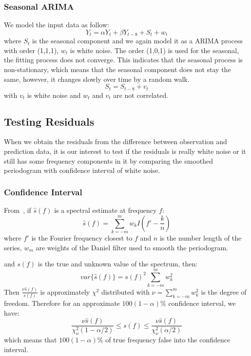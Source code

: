 \documentclass[12pt]{article}
\begin{document}
\subsubsection{Seasonal ARIMA}
We model the input data as follow:
\begin{equation}
Y_t = \alpha Y_t+\beta Y_{t-8}+S_t+w_t
\end{equation}
where $S_t$ is the seasonal component and we again model it as a ARIMA process
with order (1,1,1), $w_t$ is white noise. The order (1,0,1) is used for the
seasonal, the fitting process does not converge. This indicates that the seasonal process is
non-stationary, which means that the seasonal component does not stay the same,
however, it changes slowly over time by a random walk.
\begin{equation}
S_t = S_{t-8}+v_t
\end{equation}
with $v_t$ is white noise and $w_t$ and $v_t$ are not correlated.

\subsection{Testing Residuals}
When we obtain the residuals from the difference between observation and
prediction data, it is our interest to test if the residuals is really white
noise or it still has some frequency components in it by comparing the smoothed
periodogram with confidence interval of white noise.

\subsubsection{Confidence Interval}
% 
From~\cite{bloomfieldFourierTimeSeries}, if $\hat{s}(f)$ is a spectral estimate
at frequency $f$: 
\begin{equation}
\hat{s}(f)=\sum_{k=-m}^mw_kI(f'-\frac{k}{n})
\end{equation}
where $f'$ is the Fourier frequency closest to $f$ and $n$ is the number length
of the series, $w_m$ are weights of the Daniel filter used to smooth the
periodogram.

and $s(f)$ is the true and unknown value of the spectrum, then:
\begin{equation}
var\{\hat{s}(f)\}=s(f)^2\sum_{k=-m}^mw_k^2
\end{equation}
Then
$\frac{\nu \hat{s}(f)}{s(f)}$ is approximately $\chi^2$ distributed with
$\nu=\sum_{k=-m}^mw_k^2$ is the degree of freedom. Therefore for an approximate
$100(1-\alpha)\%$ confidence interval, we have:
\begin{equation}\label{eqn:confidenceInterval}
\frac{\nu\hat{s}(f)}{\chi_{\nu}^2(1-\alpha/2)}\leq s(f)\leq
\frac{\nu\hat{s}(f)}{\chi_{\nu}^2(\alpha/2)}
\end{equation}
which means that $100(1-\alpha)\%$ of true frequency false into the confidence
interval.
\end{document}
